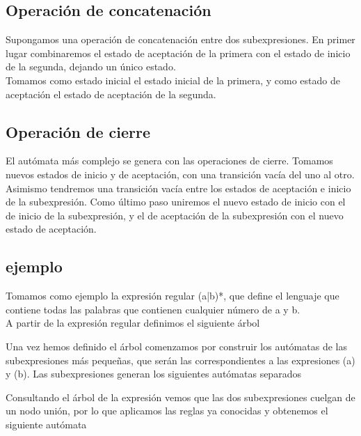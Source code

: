 
\subsection{Operación de concatenación}
Supongamos una operación de concatenación entre dos subexpresiones.
En primer lugar combinaremos el estado de aceptación de la primera con el estado de inicio de la segunda, dejando un único estado.
\\
Tomamos como estado inicial el estado inicial de la primera, y como estado de aceptación el estado de aceptación de la segunda.


\subsection{Operación de cierre}
El autómata más complejo se genera con las operaciones de cierre.
Tomamos nuevos estados de inicio y de aceptación, con una transición vacía del uno al otro.
Asimismo tendremos una transición vacía entre los estados de aceptación e inicio de la subexpresión.
Como último paso uniremos el nuevo estado de inicio con el de inicio de la subexpresión, y el de aceptación de la subexpresión con el nuevo estado de aceptación.


\subsection{ejemplo}
Tomamos como ejemplo la expresión regular (a|b)*, que define el lenguaje que contiene todas las palabras que contienen cualquier número de a y b.
\\
A partir de la expresión regular definimos el siguiente árbol


Una vez hemos definido el árbol comenzamos por construir los autómatas de las subexpresiones más pequeñas, que serán las correspondientes a las expresiones (a) y (b).
Las subexpresiones generan los siguientes autómatas separados


Consultando el árbol de la expresión vemos que las dos subexpresiones cuelgan de un nodo unión, por lo que aplicamos las reglas ya conocidas y obtenemos el siguiente autómata

